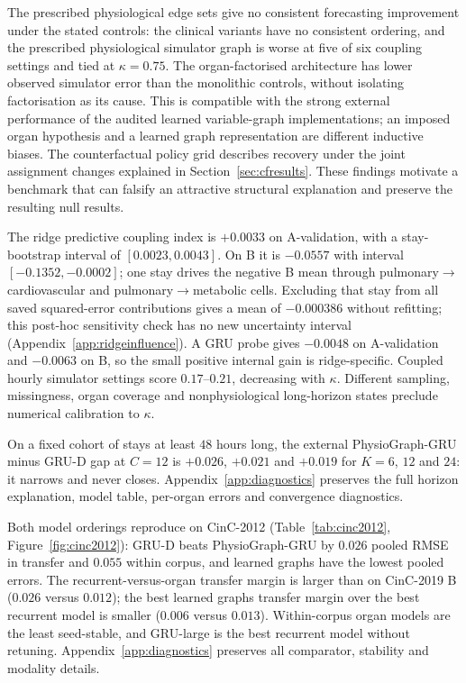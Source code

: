 The prescribed physiological edge sets give no consistent forecasting improvement under the stated controls: the clinical variants have no consistent ordering, and the prescribed physiological simulator graph is worse at five of six coupling settings and tied at $\kappa=0.75$. The organ-factorised architecture has lower observed simulator error than the monolithic controls, without isolating factorisation as its cause. This is compatible with the strong external performance of the audited learned variable-graph implementations; an imposed organ hypothesis and a learned graph representation are different inductive biases. The counterfactual policy grid describes recovery under the joint assignment changes explained in Section~\ref{sec:cfresults}. These findings motivate a benchmark that can falsify an attractive structural explanation and preserve the resulting null results.

The ridge predictive coupling index is $+0.0033$ on A-validation, with a stay-bootstrap interval of $[0.0023,\allowbreak 0.0043]$. On B it is $-0.0557$ with interval $[-0.1352,\allowbreak -0.0002]$; one stay drives the negative B mean through pulmonary$\rightarrow$\allowbreak{}cardiovascular and pulmonary$\rightarrow$\allowbreak{}metabolic cells. Excluding that stay from all saved squared-error contributions gives a mean of $-0.000386$ without refitting; this post-hoc sensitivity check has no new uncertainty interval (Appendix~\ref{app:ridgeinfluence}). A GRU probe gives $-0.0048$ on A-validation and $-0.0063$ on B, so the small positive internal gain is ridge-specific. Coupled hourly simulator settings score $0.17$--$0.21$, decreasing with $\kappa$. Different sampling, missingness, organ coverage and nonphysiological long-horizon states preclude numerical calibration to $\kappa$.

On a fixed cohort of stays at least $48$ hours long, the external PhysioGraph-GRU minus GRU-D gap at $C=12$ is $+0.026$, $+0.021$ and $+0.019$ for $K=6$, $12$ and $24$: it narrows and never closes. Appendix~\ref{app:diagnostics} preserves the full horizon explanation, model table, per-organ errors and convergence diagnostics.

Both model orderings reproduce on CinC-2012 (Table~\ref{tab:cinc2012}, Figure~\ref{fig:cinc2012}): GRU-D beats PhysioGraph-GRU by $0.026$ pooled RMSE in transfer and $0.055$ within corpus, and learned graphs have the lowest pooled errors. The recurrent-versus-organ transfer margin is larger than on CinC-2019 B ($0.026$ versus $0.012$); the best learned graph\textquotesingle s transfer margin over the best recurrent model is smaller ($0.006$ versus $0.013$). Within-corpus organ models are the least seed-stable, and GRU-large is the best recurrent model without retuning. Appendix~\ref{app:diagnostics} preserves all comparator, stability and modality details.


